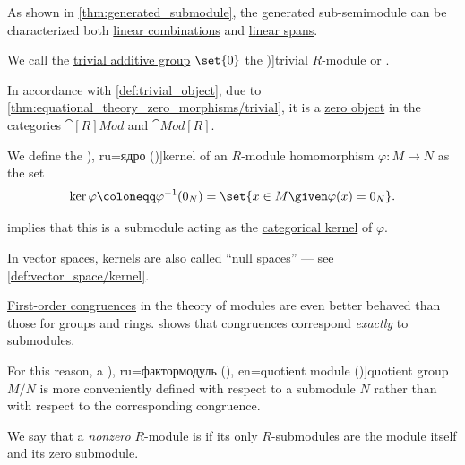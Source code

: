 \begin{definition}
\begin{thmenum}
    As shown in \cref{thm:generated_submodule}, the generated sub-semimodule can be characterized both \hyperref[def:linear_combination]{linear combinations} and \hyperref[def:linear_span]{linear spans}.

     We call the \hyperref[def:group/trivial]{trivial additive group} \( \set{ 0 } \) the \term[en=trivial module (\cite[176]{Aluffi2009Algebra})]{trivial \( R \)-module} or .

    In accordance with \cref{def:trivial_object}, due to \cref{thm:equational_theory_zero_morphisms/trivial}, it is a \hyperref[def:universal_objects/zero]{zero object} in the categories \( \cat[R]{Mod} \) and \( \cat{Mod}[R] \).

     We define the \term[bg=ядро (\cite[241]{ГеновМиховскиМоллов1991Алгебра}), ru=ядро (\cite[397]{Винберг2014КурсАлгебры})]{kernel} of an \( R \)-module homomorphism \( \varphi: M \to N \) as the set
    \begin{equation}\label{eq:def:module/kernel}
      \ker \varphi \coloneqq \varphi^{-1}(0_N) = \set{ x \in M \given \varphi(x) = 0_N }.
    \end{equation}

     implies that this is a submodule acting as the \hyperref[def:categorical_kernels/kernel]{categorical kernel} of \( \varphi \).

    In vector spaces, kernels are also called \enquote{null spaces} --- see \cref{def:vector_space/kernel}.

    \mimprovised \hyperref[def:fol_congruence]{First-order congruences} in the theory of modules are even better behaved than those for groups and rings.  shows that congruences correspond \emph{exactly} to submodules.

    For this reason, a \term[bg=фактор-модул (\cite[241]{ГеновМиховскиМоллов1991Алгебра}), ru=фактормодуль (\cite[398]{Тыртышников2017ОсновыАлгебры}), en=quotient module (\cite[197]{Bourbaki1998Algebra1to3})]{quotient group} \( M / N \) is more conveniently defined with respect to a submodule \( N \) rather than with respect to the corresponding congruence.

     We say that a \emph{nonzero} \( R \)-module is  if its only \( R \)-submodules are the module itself and its zero submodule.


\end{thmenum}
\end{definition}
